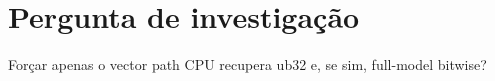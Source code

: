 \section{Pergunta de investigação}
Forçar apenas o vector path CPU recupera ub32 e, se sim, full-model bitwise?
